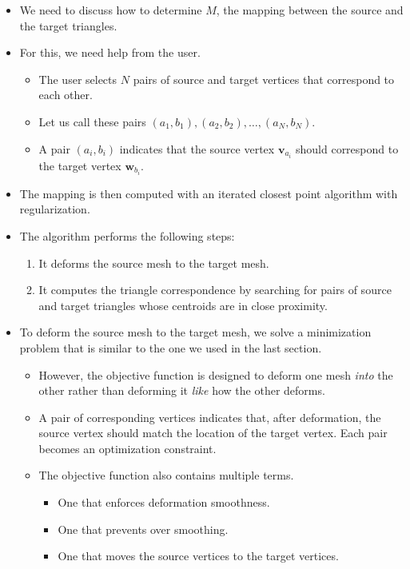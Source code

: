 \documentclass[10pt]{article}
\newcommand{\ve}[1]{\mathbf{#1}}
\begin{document}
\begin{itemize}
    \item We need to discuss how to determine $M$, the mapping between the source and the target triangles.
    
    \item For this, we need help from the user.
    \begin{itemize}
        \item The user selects $N$ pairs of source and target vertices that correspond to each other.
        \item Let us call these pairs $(a_1, b_1), (a_2, b_2), \ldots, (a_N, b_N)$.
        \item A pair $(a_i, b_i)$ indicates that the source vertex $\ve{v}_{a_i}$ should correspond to the target vertex $\ve{w}_{b_i}$.
    \end{itemize}

    \item The mapping is then computed with an iterated closest point algorithm with regularization.
    
    \item The algorithm performs the following steps:
    \begin{enumerate}
        \item It deforms the source mesh to the target mesh.
        \item It computes the triangle correspondence by searching for pairs of source and target triangles whose centroids are in close proximity.
    \end{enumerate}    

    \item To deform the source mesh to the target mesh, we solve a minimization problem that is similar to the one we used in the last section.
    
    \begin{itemize}
        \item However, the objective function is designed to deform one mesh \emph{into} the other rather than deforming it \emph{like} how the other deforms.
        
        \item A pair of corresponding vertices indicates that, after deformation, the source vertex should match the location of the target vertex. Each pair becomes an optimization constraint.
        
        \item The objective function also contains multiple terms.
        \begin{itemize}
            \item One that enforces deformation smoothness.
            \item One that prevents over smoothing.
            \item One that moves the source vertices to the target vertices.
        \end{itemize}
    \end{itemize}


\end{itemize}
\end{document}
